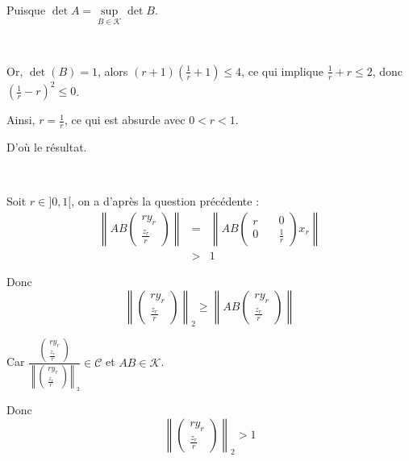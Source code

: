 Puisque $\det A = \underset{B \in \mathcal{K}}{\sup} \det B$.

\

Or, $\det (B) = 1$, alors $(r + 1) \left( \frac{1}{r} + 1 \right) \leqslant
4$, ce qui implique $\frac{1}{r} + r \leqslant 2$, donc $\left( \frac{1}{r} -
r \right)^2 \leqslant 0$.

Ainsi, $r = \frac{1}{r}$, ce qui est absurde avec $0 < r < 1$.

D'o{\`u} le r{\'e}sultat.

\

 Soit $r \in] 0, 1 [$, on a d'apr{\`e}s la question
pr{\'e}c{\'e}dente :
\begin{eqnarray*}
  \left\| A B \left( \begin{array}{c}
    r y_r\\
    \frac{z_r}{r}
  \end{array} \right) \text{} \right\| & = & \left\| A B \left(
  \begin{array}{c}
    r\\
    0
  \end{array} \quad \begin{array}{c}
    0\\
    \frac{1}{r}
  \end{array} \right) \text{} x_r \right\|\\
  & > & 1
\end{eqnarray*}


Donc
\[ \left\| \left( \begin{array}{c}
     r y_r\\
     \frac{z_r}{r}
   \end{array} \right) \right\|_2 \geqslant \left\| A B \left(
   \begin{array}{c}
     r y_r\\
     \frac{z_r}{r}
   \end{array} \right) \text{} \right\| \]


Car $\frac{\left( \begin{array}{c}
  r y_r\\
  \frac{z_r}{r}
\end{array} \right) \text{}}{\left\| \left( \begin{array}{c}
  r y_r\\
  \frac{z_r}{r}
\end{array} \right) \text{} \right\|_2} \in \mathcal{C}$ et $A B \in
\mathcal{K}$.

Donc
\[ \left\| \left( \begin{array}{c}
     r y_r\\
     \frac{z_r}{r}
   \end{array} \right) \right\|_2 > 1 \]


